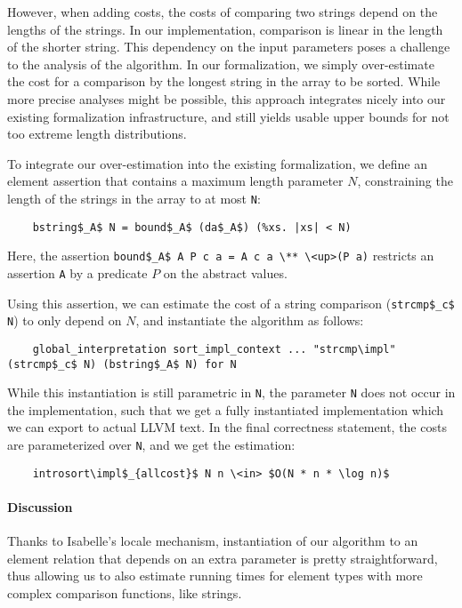 \documentclass[acmsmall]{acmart}
\newcommand{\is}{\lstinline[language=isabelle]}
\begin{document}
  However, when adding costs, the costs of comparing two strings depend on the lengths of the strings. In our implementation, comparison is linear in the length of the shorter string.
  This dependency on the input parameters poses a challenge to the analysis of the algorithm.
  In our formalization, we simply over-estimate the cost for a comparison by the longest string in the array to be sorted. While more precise analyses might be possible, this approach integrates nicely into our existing formalization infrastructure, and still yields usable upper bounds for not too extreme length distributions. %
  
  To integrate our over-estimation into the existing formalization, we define an element assertion that contains a maximum length parameter $N$, constraining the length of the strings in the array to at most \is$N$:
\begin{lstlisting}
    bstring$_A$ N = bound$_A$ (da$_A$) (%xs. |xs| < N)
\end{lstlisting}
Here, the assertion \is{bound$_A$ A P c a = A c a \** \<up>(P a)} restricts an assertion \is{A} by a predicate $P$ on the abstract values.
  
  Using this assertion, we can estimate the cost of a string comparison (\is{strcmp$_c$ N}) to only depend on $N$, and instantiate the algorithm as follows:
\begin{lstlisting}
    global_interpretation sort_impl_context ... "strcmp\impl" (strcmp$_c$ N) (bstring$_A$ N) for N
\end{lstlisting}
  While this instantiation is still parametric in \is$N$, the parameter \is$N$ does not occur in the implementation, such that we get a fully instantiated implementation which we can export to actual LLVM text. In the final correctness statement, the costs are parameterized over \is$N$, and we get the estimation:
\begin{lstlisting}
    introsort\impl$_{allcost}$ N n \<in> $O(N * n * \log n)$
\end{lstlisting}

\paragraph{Discussion}
  Thanks to Isabelle's locale mechanism, instantiation of our algorithm to an element relation that depends on an extra parameter is pretty straightforward, thus allowing us to 
  also estimate running times for element types with more complex comparison functions, like strings. 
  
\end{document}
